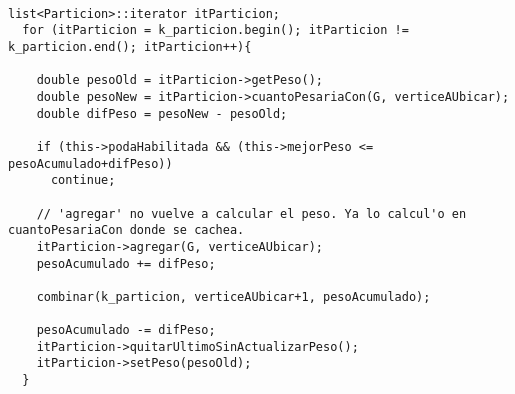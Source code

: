\begin{lstlisting}

list<Particion>::iterator itParticion;
  for (itParticion = k_particion.begin(); itParticion != k_particion.end(); itParticion++){

    double pesoOld = itParticion->getPeso();
    double pesoNew = itParticion->cuantoPesariaCon(G, verticeAUbicar);
    double difPeso = pesoNew - pesoOld;

    if (this->podaHabilitada && (this->mejorPeso <= pesoAcumulado+difPeso))
      continue;

    // 'agregar' no vuelve a calcular el peso. Ya lo calcul'o en cuantoPesariaCon donde se cachea.
    itParticion->agregar(G, verticeAUbicar);
    pesoAcumulado += difPeso;

    combinar(k_particion, verticeAUbicar+1, pesoAcumulado);

    pesoAcumulado -= difPeso;
    itParticion->quitarUltimoSinActualizarPeso();
    itParticion->setPeso(pesoOld);
  }

\end{lstlisting}


